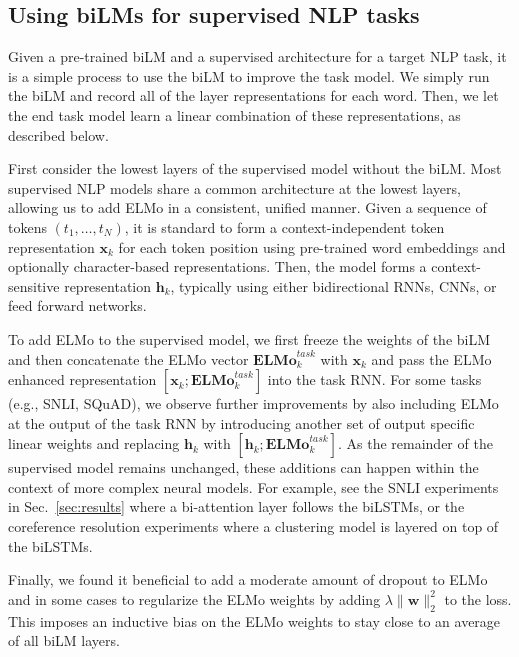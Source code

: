 \documentclass[11pt,a4paper]{article}
\newcommand{\ELMO}{ELMo}
\begin{document}
\subsection{Using biLMs for supervised NLP tasks}
\label{sec:using_bilm}
Given a pre-trained biLM and a supervised architecture for a target NLP task, it is a simple process to use the biLM to improve the task model.
We simply run the biLM and record all of the layer representations for each word.  Then, we let the end task model learn a linear combination of these representations, as described below. 

First consider the lowest layers of the supervised model without the biLM.
Most supervised NLP models share a common architecture at the lowest layers, allowing us to add \ELMO{} in a consistent, unified manner.
Given a sequence of tokens $(t_1, \ldots, t_N)$, it is standard to form a context-independent token representation $\mathbf{x}_k$ for each token position using pre-trained word embeddings and optionally character-based representations.
Then, the model forms a context-sensitive representation
$\mathbf{h}_k$, typically using either bidirectional RNNs, CNNs, or feed forward networks.

To add \ELMO{} to the supervised model, we first freeze the weights of the biLM and then concatenate the \ELMO{} vector $\mathbf{\ELMO}^{task}_k$ with $\mathbf{x}_k$ and pass the \ELMO{} enhanced representation $[\mathbf{x}_k; \mathbf{\ELMO}^{task}_k]$ into the task RNN.
For some tasks (e.g., SNLI, SQuAD), we observe further improvements by also including \ELMO{} at the output of the task RNN by introducing another set of output specific linear weights and replacing $\mathbf{h}_k$ with $[\mathbf{h}_k; \mathbf{\ELMO}^{task}_k]$.
As the remainder of the supervised model remains unchanged, these additions can happen within the context of more complex neural models.
For example, see the SNLI experiments in Sec.~\ref{sec:results} where a bi-attention layer follows the biLSTMs, or the coreference resolution experiments where a clustering model is layered on top of the biLSTMs. 

Finally, we found it beneficial to add a moderate amount of dropout to \ELMO{} \citep{Srivastava2014DropoutAS} and in some cases to regularize the \ELMO{} weights by
adding
$\lambda \lVert \mathbf{w} \rVert_2^2$ to the loss.
This imposes an inductive bias on the \ELMO{} weights to stay close to an average of all biLM layers.
\end{document}
